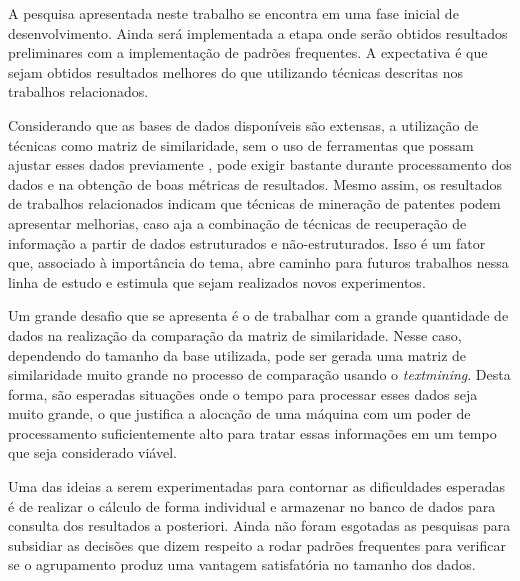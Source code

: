 \documentclass[12pt]{article}
\begin{document}
A pesquisa apresentada neste trabalho se encontra em uma fase inicial de desenvolvimento. 
Ainda será implementada a etapa onde serão obtidos resultados preliminares com a implementação de padrões frequentes.
A expectativa é que sejam obtidos resultados melhores do que utilizando técnicas descritas nos trabalhos relacionados. 

Considerando que as bases de dados disponíveis são extensas, a utilização de técnicas como matriz de similaridade, sem o uso de ferramentas que possam ajustar esses dados previamente \citep{gerken2012new}, pode exigir bastante durante processamento dos dados e na obtenção de boas métricas de resultados. 
Mesmo assim, os resultados de trabalhos relacionados indicam que técnicas de mineração de patentes podem apresentar melhorias, caso aja a combinação de técnicas de recuperação de informação a partir de dados estruturados e não-estruturados. Isso é um fator que, associado à importância do tema, abre caminho para futuros trabalhos nessa linha de estudo e estimula que sejam realizados novos experimentos.

Um grande desafio que se apresenta é o de trabalhar com a grande quantidade de dados na realização da comparação da matriz de similaridade. Nesse caso, dependendo do tamanho da base utilizada, pode ser gerada uma matriz de similaridade muito grande no processo de comparação usando o \textit{textmining}. 
Desta forma, são esperadas situações onde o tempo para processar esses dados seja muito grande, o que justifica a alocação de uma máquina com um poder de processamento suficientemente alto para tratar essas informações em um tempo que seja considerado viável.

Uma das ideias a serem experimentadas para contornar as dificuldades esperadas é de realizar o cálculo de forma individual e armazenar no banco de dados para consulta dos resultados a posteriori. Ainda não foram esgotadas as pesquisas para subsidiar as decisões que dizem respeito
a rodar padrões frequentes para verificar se o agrupamento produz uma vantagem satisfatória no tamanho dos 
dados.




\end{document}
